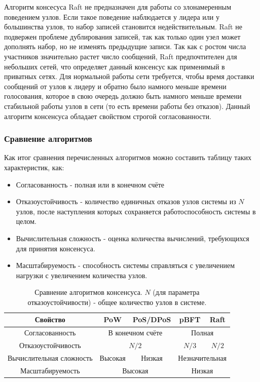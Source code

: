 \documentclass[subf, href, colorlinks=true, 14pt,
times, mtpro, specialist]{disser}
\theoremstyle{definition}
\begin{document}
Алгоритм консесуса Raft не предназначен для работы со злонамеренным поведением узлов. Если такое поведение наблюдается у лидера или у большинства узлов, то набор записей становится недействительным. 
Raft не подвержен проблеме дублирования записей, так как только один узел может дополнять набор, но не изменять предыдущие записи. Так как с ростом числа участников значительно растет число сообщений, Raft предпочтителен для небольших сетей, что определяет данный консенсус как применимый в приватных сетях. Для нормальной работы сети требуется, чтобы время доставки сообщений от узлов к лидеру и обратно было намного меньше времени голосования, которое в свою очередь должно быть намного меньше времени стабильной работы узлов в сети (то есть времени работы без отказов). Данный алгоритм консенсуса обладает свойством строгой согласованности.

\subsubsection{Сравнение алгоритмов}

Как итог сравнения перечисленных алгоритмов можно составить таблицу таких характеристик, как:
\begin{itemize}
\item Согласованность - полная или в конечном счёте
\item Отказоустойчивость - количество единичных отказов узлов системы из $N$ узлов, после наступления которых сохраняется работоспособность системы в целом. 
\item Вычислительная сложность - оценка количества вычислений, требующихся для принятия консенсуса.
\item Масштабируемость - способность системы справляться с увеличением нагрузки с увеличением количества узлов.
\end{itemize}

\begin{table}[H]
\begin{center}
\begin{tabular}{|c|c|c|c|c|}
\hline
Свойство & PoW & PoS/DPoS & pBFT & Raft \\
\hline
Согласованность & \multicolumn{2}{c}{В конечном счёте} & \multicolumn{2}{|c|}{Полная}    \\
\hline
Отказоустойчивость & \multicolumn{2}{c|}{$N/2$} & $N/3$ & $N/2$  \\
\hline
Вычислительная сложность  & Высокая & Низкая & \multicolumn{2}{c|}{Незначительная}  \\
\hline
Масштабируемость & \multicolumn{2}{c|}{Высокая} & \multicolumn{2}{c|}{Низкая}  \\
\hline
\end{tabular}
\end{center}
\caption{Сравнение алгоритмов консенсуса.  $N$ (для параметра отказоустойчивости) - общее количество узлов в системе.}
\end{table} 
\end{document}
